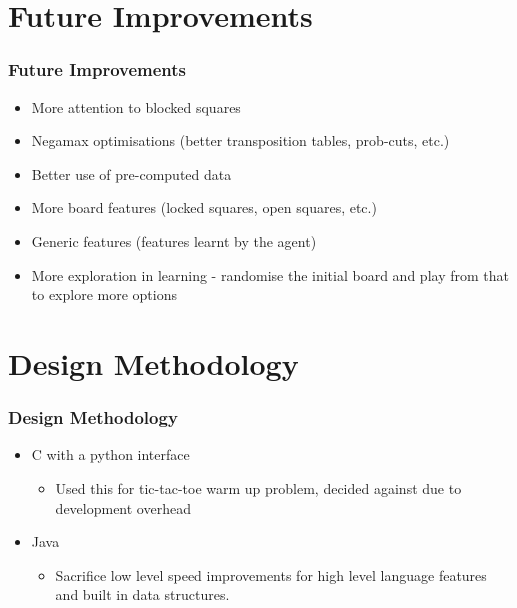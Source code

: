 \documentclass[10pt]{beamer}
\begin{document}
\section{Future Improvements}

\begin{frame}
  \frametitle{Future Improvements}
  \begin{itemize}
  \item<1-> More attention to blocked squares
  \item<2-> Negamax optimisations (better transposition tables, prob-cuts, etc.)
  \item<3-> Better use of pre-computed data
  \item<4-> More board features (locked squares, open squares, etc.)
  \item<5-> Generic features (features learnt by the agent)
  \item<6-> More exploration in learning - randomise the initial board and play from that to explore more options
  \end{itemize}
\end{frame}

\section{Design Methodology}

\begin{frame}
\frametitle{Design Methodology}
  \begin{itemize}
  \item<1-> C with a python interface
      \begin{itemize}
        \item<1-> Used this for tic-tac-toe warm up problem, decided against due to development overhead 
      \end{itemize}
  \item<2-> Java
      \begin{itemize}
        \item<2->  Sacrifice low level speed improvements for high level language features and built in data structures.
      \end{itemize}
  \end{itemize}
\end{frame}
\end{document}
